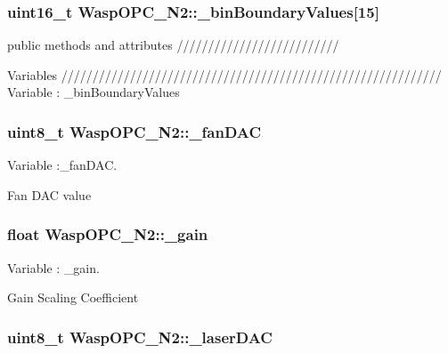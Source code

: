 \subsubsection[{\texorpdfstring{\+\_\+bin\+Boundary\+Values}{_binBoundaryValues}}]{\setlength{\rightskip}{0pt plus 5cm}uint16\+\_\+t Wasp\+O\+P\+C\+\_\+\+N2\+::\+\_\+bin\+Boundary\+Values\mbox{[}15\mbox{]}}\hypertarget{class_wasp_o_p_c___n2_a385a98a1cf1c93752e278ea680b7c6cc}{}\label{class_wasp_o_p_c___n2_a385a98a1cf1c93752e278ea680b7c6cc}


public methods and attributes ////////////////////////// 

Variables ///////////////////////////////////////////////////////////// Variable \+: \+\_\+bin\+Boundary\+Values 
\subsubsection[{\texorpdfstring{\+\_\+fan\+D\+AC}{_fanDAC}}]{\setlength{\rightskip}{0pt plus 5cm}uint8\+\_\+t Wasp\+O\+P\+C\+\_\+\+N2\+::\+\_\+fan\+D\+AC}\hypertarget{class_wasp_o_p_c___n2_ab9608d0ce5f797b60cb4dcad2ec92a26}{}\label{class_wasp_o_p_c___n2_ab9608d0ce5f797b60cb4dcad2ec92a26}


Variable \+:\+\_\+fan\+D\+AC. 

Fan D\+AC value 
\subsubsection[{\texorpdfstring{\+\_\+gain}{_gain}}]{\setlength{\rightskip}{0pt plus 5cm}float Wasp\+O\+P\+C\+\_\+\+N2\+::\+\_\+gain}\hypertarget{class_wasp_o_p_c___n2_a0330e72731f0012f42d0860fa1736170}{}\label{class_wasp_o_p_c___n2_a0330e72731f0012f42d0860fa1736170}


Variable \+: \+\_\+gain. 

Gain Scaling Coefficient 
\subsubsection[{\texorpdfstring{\+\_\+laser\+D\+AC}{_laserDAC}}]{\setlength{\rightskip}{0pt plus 5cm}uint8\+\_\+t Wasp\+O\+P\+C\+\_\+\+N2\+::\+\_\+laser\+D\+AC}\hypertarget{class_wasp_o_p_c___n2_a42c4151482bde09970432c2cb2856091}{}\label{class_wasp_o_p_c___n2_a42c4151482bde09970432c2cb2856091}


